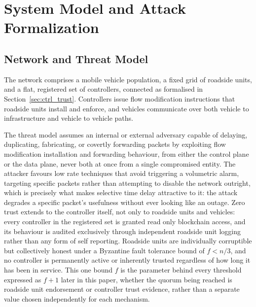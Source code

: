 \documentclass[final,5p,twocolumn]{elsarticle}
\theoremstyle{remark}
\theoremstyle{plain}
\begin{document}
\section{System Model and Attack Formalization}
\label{system_model}

\subsection{Network and Threat Model}
\label{sec:threat_model}

The network comprises a mobile vehicle population, a fixed grid of
roadside units, and a flat, registered set of controllers, connected as
formalised in Section~\ref{sec:ctrl_trust}. Controllers issue flow
modification instructions that roadside units install and enforce, and
vehicles communicate over both vehicle to infrastructure and vehicle to
vehicle paths.

The threat model assumes an internal or external adversary capable of
delaying, duplicating, fabricating, or covertly forwarding packets by
exploiting flow modification installation and forwarding behaviour, from
either the control plane or the data plane, never both at once from a
single compromised entity. The attacker favours low rate techniques that
avoid triggering a volumetric alarm, targeting specific packets rather
than attempting to disable the network outright, which is precisely what
makes selective time delay attractive to it: the attack degrades a
specific packet's usefulness without ever looking like an outage. Zero
trust extends to the controller itself, not only to roadside units and
vehicles: every controller in the registered set is granted read only
blockchain access, and its behaviour is audited exclusively through
independent roadside unit logging rather than any form of self reporting.
Roadside units are individually corruptible but collectively honest under
a Byzantine fault tolerance bound of $f<n/3$, and no controller is
permanently active or inherently trusted regardless of how long it has
been in service. This one bound $f$ is the parameter behind every
threshold expressed as $f{+}1$ later in this paper, whether the quorum
being reached is roadside unit endorsement or controller trust evidence,
rather than a separate value chosen independently for each mechanism.
\end{document}
